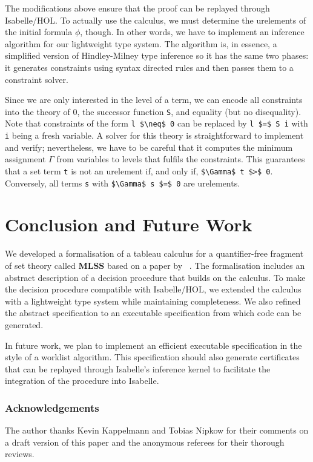 \documentclass[runningheads]{llncs}
\newcommand{\MLSS}{\textbf{MLSS}}
\begin{document}
The modifications above ensure that the proof can be replayed through Isabelle/HOL.
To actually use the calculus, we must determine the urelements of the initial formula $\phi$, though.
In other words, we have to implement an inference algorithm for our lightweight type system.
The algorithm is, in essence, a simplified version of Hindley-Milney type inference so it has the same two phases:
it generates constraints using syntax directed rules and then passes them to a constraint solver.

Since we are only interested in the level of a term, we can encode all constraints into the theory of $0$, the successor function \lstinline!S!, and equality (but no disequality).
Note that constraints of the form \lstinline!l $\neq$ 0! can be replaced by \lstinline!l $=$ S i! with \lstinline!i! being a fresh variable.
A solver for this theory is straightforward to implement and verify;
nevertheless, we have to be careful that it computes the minimum assignment $\Gamma$ from variables to levels that fulfils the constraints. 
This guarantees that a set term \lstinline!t! is not an urelement if, and only if, \lstinline!$\Gamma$ t $>$ 0!.
Conversely, all terms \lstinline!s! with \lstinline!$\Gamma$ s $=$ 0! are urelements.

\section{Conclusion and Future Work}
We developed a formalisation of a tableau calculus for a quantifier-free fragment of set theory called \MLSS{} based on a paper by \citeauthor{new_fast_tableau}~\cite{new_fast_tableau}. 
The formalisation includes an abstract description of a decision procedure that builds on the calculus.
To make the decision procedure compatible with Isabelle/HOL, we extended the calculus with a lightweight type system while maintaining completeness.
We also refined the abstract specification to an executable specification from which code can be generated.

In future work, we plan to implement an efficient executable specification in the style of a worklist algorithm. 
This specification should also generate certificates that can be replayed through Isabelle's inference kernel to facilitate the integration of the procedure into Isabelle.


\subsubsection{Acknowledgements}
The author thanks Kevin Kappelmann and Tobias Nipkow for their comments on a draft version of this paper and the anonymous referees for their thorough reviews.



\end{document}
